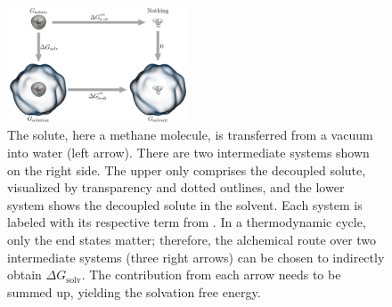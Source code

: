 \documentclass[9pt,tutorial]{livecoms}
\begin{document}
\begin{figure}[H]
    \centering
    \includegraphics[width=0.48\textwidth]{figures/thermodynamicCycle.png}
    \caption{The solute, here a methane molecule, is transferred from a vacuum into water (left arrow). There are two intermediate systems shown on the right side. The upper only comprises the decoupled solute, visualized by transparency and dotted outlines, and the lower system shows the decoupled solute in the solvent. Each system is labeled with its respective term from . In a thermodynamic cycle, only the end states matter; therefore, the alchemical route over two intermediate systems (three right arrows) can be chosen to indirectly obtain $\Delta G_\text{solv}$. The contribution from each arrow needs to be summed up, yielding the solvation free energy.}
    \label{fig:thermodynamiccycle}
\end{figure}
\end{document}
